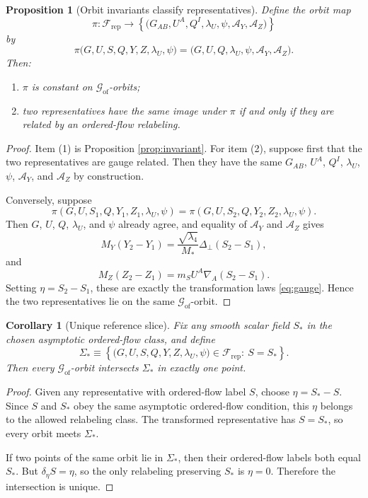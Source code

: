 \documentclass[11pt]{article}
\newcommand{\AY}{\mathcal A_Y}
\newcommand{\AZ}{\mathcal A_Z}
\newcommand{\FieldSpace}{\mathscr F}
\newcommand{\RepFieldSpace}{\FieldSpace_{\mathrm{rep}}}
\newcommand{\GaugeGroup}{\mathscr G_{\mathrm{of}}}
\newcommand{\Slice}{\Sigma_*}
\newtheorem{proposition}{Proposition}
\newtheorem{corollary}{Corollary}
\begin{document}
\begin{proposition}[Orbit invariants classify representatives]
\label{prop:classify}
Define the orbit map
\begin{equation}
\pi:
\RepFieldSpace\to
\left\{
\bigl(G_{AB},U^A,Q^I,\lambda_U,\psi,\AY,\AZ\bigr)
\right\}
\label{eq:orbitmap}
\end{equation}
by
\[
\pi\bigl(G,U,S,Q,Y,Z,\lambda_U,\psi\bigr)
=
\bigl(G,U,Q,\lambda_U,\psi,\AY,\AZ\bigr).
\]
Then:
\begin{enumerate}
    \item \(\pi\) is constant on \(\GaugeGroup\)-orbits;
    \item two representatives have the same image under \(\pi\) if and only if they are related by an ordered-flow relabeling.
\end{enumerate}
\end{proposition}

\begin{proof}
Item (1) is Proposition \ref{prop:invariant}. For item (2), suppose first that the two representatives are gauge related. Then they have the same \(G_{AB}\), \(U^A\), \(Q^I\), \(\lambda_U\), \(\psi\), \(\AY\), and \(\AZ\) by construction.

Conversely, suppose
\[
\pi(G,U,S_1,Q,Y_1,Z_1,\lambda_U,\psi)
=
\pi(G,U,S_2,Q,Y_2,Z_2,\lambda_U,\psi).
\]
Then \(G\), \(U\), \(Q\), \(\lambda_U\), and \(\psi\) already agree, and equality of \(\AY\) and \(\AZ\) gives
\[
M_Y(Y_2-Y_1)
=
\frac{\sqrt{\lambda_4}}{M_*}\Delta_\perp(S_2-S_1),
\]
and
\[
M_Z(Z_2-Z_1)
=
m_SU^A\nabla_A(S_2-S_1).
\]
Setting \(\eta=S_2-S_1\), these are exactly the transformation laws \eqref{eq:gauge}. Hence the two representatives lie on the same \(\GaugeGroup\)-orbit.
\end{proof}

\begin{corollary}[Unique reference slice]
\label{cor:slice}
Fix any smooth scalar field \(S_*\) in the chosen asymptotic ordered-flow class, and define
\begin{equation}
\Slice
\equiv
\left\{
\bigl(G,U,S,Q,Y,Z,\lambda_U,\psi\bigr)\in\RepFieldSpace:\ S=S_*
\right\}.
\label{eq:slice}
\end{equation}
Then every \(\GaugeGroup\)-orbit intersects \(\Slice\) in exactly one point.
\end{corollary}

\begin{proof}
Given any representative with ordered-flow label \(S\), choose \(\eta=S_*-S\). Since \(S\) and \(S_*\) obey the same asymptotic ordered-flow condition, this \(\eta\) belongs to the allowed relabeling class. The transformed representative has \(S=S_*\), so every orbit meets \(\Slice\).

If two points of the same orbit lie in \(\Slice\), then their ordered-flow labels both equal \(S_*\). But \(\delta_\eta S=\eta\), so the only relabeling preserving \(S_*\) is \(\eta=0\). Therefore the intersection is unique.
\end{proof}
\end{document}
